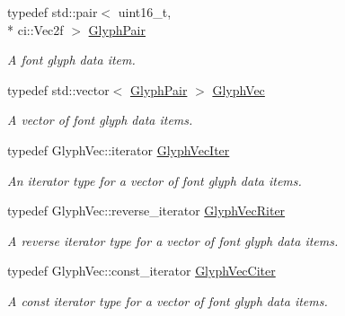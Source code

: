 \begin{DoxyCompactItemize}
\item 
\hypertarget{class_ui_text_a5e2ad88410081465fe27657d0b6f2846}{typedef std\-::pair$<$ uint16\-\_\-t, \\*
ci\-::\-Vec2f $>$ \hyperlink{class_ui_text_a5e2ad88410081465fe27657d0b6f2846}{Glyph\-Pair}}\label{class_ui_text_a5e2ad88410081465fe27657d0b6f2846}

\begin{DoxyCompactList}\small\item\em A font glyph data item. \end{DoxyCompactList}\item 
\hypertarget{class_ui_text_a06c07525f3f67cc894c681006c43434e}{typedef std\-::vector$<$ \hyperlink{class_ui_text_a5e2ad88410081465fe27657d0b6f2846}{Glyph\-Pair} $>$ \hyperlink{class_ui_text_a06c07525f3f67cc894c681006c43434e}{Glyph\-Vec}}\label{class_ui_text_a06c07525f3f67cc894c681006c43434e}

\begin{DoxyCompactList}\small\item\em A vector of font glyph data items. \end{DoxyCompactList}\item 
\hypertarget{class_ui_text_a23cd7b2191988f2baf8f38c38e56017e}{typedef Glyph\-Vec\-::iterator \hyperlink{class_ui_text_a23cd7b2191988f2baf8f38c38e56017e}{Glyph\-Vec\-Iter}}\label{class_ui_text_a23cd7b2191988f2baf8f38c38e56017e}

\begin{DoxyCompactList}\small\item\em An iterator type for a vector of font glyph data items. \end{DoxyCompactList}\item 
\hypertarget{class_ui_text_a11affb3ceed2135a8f5fe8ce0b5c6099}{typedef Glyph\-Vec\-::reverse\-\_\-iterator \hyperlink{class_ui_text_a11affb3ceed2135a8f5fe8ce0b5c6099}{Glyph\-Vec\-Riter}}\label{class_ui_text_a11affb3ceed2135a8f5fe8ce0b5c6099}

\begin{DoxyCompactList}\small\item\em A reverse iterator type for a vector of font glyph data items. \end{DoxyCompactList}\item 
\hypertarget{class_ui_text_aef51694d078b9685e99e967a339042ef}{typedef Glyph\-Vec\-::const\-\_\-iterator \hyperlink{class_ui_text_aef51694d078b9685e99e967a339042ef}{Glyph\-Vec\-Citer}}\label{class_ui_text_aef51694d078b9685e99e967a339042ef}

\begin{DoxyCompactList}\small\item\em A const iterator type for a vector of font glyph data items. \end{DoxyCompactList}\end{DoxyCompactItemize}
